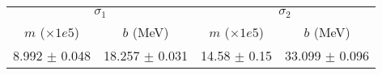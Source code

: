 \begin{tabular}{cc|cc}
\multicolumn{2}{c|}{$\sigma_1$} & \multicolumn{2}{|c}{$\sigma_2$} \\
$m$ ($\times1e5$) & $b$ (MeV) & $m$ ($\times1e5$) & $b$ (MeV) \\
\hline
8.992 $\pm$ 0.048 & 18.257 $\pm$ 0.031 & 14.58 $\pm$ 0.15 & 33.099 $\pm$ 0.096\\
\end{tabular}
